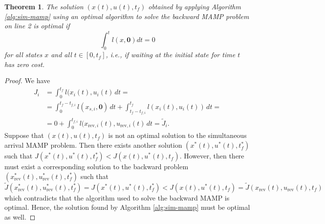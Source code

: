 \documentclass[10pt,a4paper]{amsart}
\newtheorem{theorem}{Theorem}
\begin{document}
\begin{theorem}
\label{th:optimality}
The solution $(x(t), u(t), t_f)$ obtained by applying Algorithm \ref{alg:sim-mamp} using an optimal algorithm to solve the backward MAMP problem  on line 2 is optimal if
\begin{equation}
\int_{0}^{t} l(x, \mathbf{0}) dt = 0
\end{equation}
\noindent for all states $x$ and all $t \in [0, t_f]$, i.e., if waiting at the initial state for time $t$ has zero cost.
\end{theorem}

\begin{proof}
We have
\begin{equation}
\begin{aligned}
J_i &= \int_{0}^{t_f} l(x_i(t), u_i(t) \, dt = \\
&= \int_{0}^{t_f-t_{f, i}} l(x_{s, i}, \mathbf{0}) \, dt + \int_{t_f-t_{f, i}}^{t_f} l(x_i(t), u_i(t)) \, dt = \\
&=  0 + \int_{0}^{t_{f, i}} l(x_{\text{rev}, i}(t), u_{\text{rev}, i}(t) \, dt = \tilde{J}_i.
\end{aligned}
\end{equation}
Suppose that $(x(t), u(t), t_f)$ is not an optimal solution to the simultaneous arrival MAMP problem. Then there exists another solution $(x^*(t), u^*(t), t_f^*)$ such that $J(x^*(t), u^*(t), t_f^*) < J(x(t), u^*(t), t_f)$. However, then there must exist a corresponding solution to the backward problem $(x^*_{\text{rev}}(t), u^*_{\text{rev}}(t), t_f^*)$ such that $\tilde{J}(x^*_{\text{rev}}(t), u^*_{\text{rev}}(t), t_f^*) = J(x^*(t), u^*(t), t_f^*) < J(x(t), u^*(t), t_f) = \tilde{J}(x_{\text{rev}}(t), u_{\text{rev}}(t), t_f)$ which contradicts that the algorithm used to solve the backward MAMP is optimal. Hence, the solution found by Algorithm \ref{alg:sim-mamp} must be optimal as well.
\end{proof}
\end{document}
